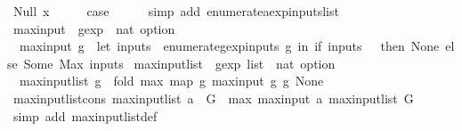 \begin{isabellebody}
\ {\isacharparenleft}Null\ x{\isacharparenright}\isanewline
\ \ \isamarkupfalse%
\ \isamarkupfalse%
\ {\isacharquery}case\isanewline
\ \ \ \ \isamarkupfalse%
\ {\isacharparenleft}simp\ add{\isacharcolon}\ enumerate{\isacharunderscore}aexp{\isacharunderscore}inputs{\isacharunderscore}list{\isacharparenright}\isanewline
{}\isamarkupfalse%
%
\endisatagproof
{\isafoldproof}%
%
\isadelimproof
\isanewline
%
\endisadelimproof
\isanewline
{}\isamarkupfalse%
\ max{\isacharunderscore}input\ {\isacharcolon}{\isacharcolon}\ {\isachardoublequoteopen}gexp\ {\isasymRightarrow}\ nat\ option{\isachardoublequoteclose}\ \isanewline
\ \ {\isachardoublequoteopen}max{\isacharunderscore}input\ g\ {\isacharequal}\ {\isacharparenleft}let\ inputs\ {\isacharequal}\ {\isacharparenleft}enumerate{\isacharunderscore}gexp{\isacharunderscore}inputs\ g{\isacharparenright}\ in\ if\ inputs\ {\isacharequal}\ {\isacharbraceleft}{\isacharbraceright}\ then\ None\ else\ Some\ {\isacharparenleft}Max\ inputs{\isacharparenright}{\isacharparenright}{\isachardoublequoteclose}\isanewline
\isanewline
{}\isamarkupfalse%
\ max{\isacharunderscore}input{\isacharunderscore}list\ {\isacharcolon}{\isacharcolon}\ {\isachardoublequoteopen}gexp\ list\ {\isasymRightarrow}\ nat\ option{\isachardoublequoteclose}\ \isanewline
\ \ {\isachardoublequoteopen}max{\isacharunderscore}input{\isacharunderscore}list\ g\ {\isacharequal}\ {\isacharparenleft}fold\ max\ {\isacharparenleft}map\ {\isacharparenleft}{\isasymlambda}g{\isachardot}\ max{\isacharunderscore}input\ g{\isacharparenright}\ g{\isacharparenright}\ None{\isacharparenright}{\isachardoublequoteclose}\isanewline
\isanewline
{}\isamarkupfalse%
\ max{\isacharunderscore}input{\isacharunderscore}list{\isacharunderscore}cons{\isacharcolon}\ {\isachardoublequoteopen}max{\isacharunderscore}input{\isacharunderscore}list\ {\isacharparenleft}a\ {\isacharhash}\ G{\isacharparenright}\ {\isacharequal}\ max\ {\isacharparenleft}max{\isacharunderscore}input\ a{\isacharparenright}\ {\isacharparenleft}max{\isacharunderscore}input{\isacharunderscore}list\ G{\isacharparenright}{\isachardoublequoteclose}\isanewline
%
\isadelimproof
\ \ %
\endisadelimproof
%
\isatagproof
{}\isamarkupfalse%
\ {\isacharparenleft}simp\ add{\isacharcolon}\ max{\isacharunderscore}input{\isacharunderscore}list{\isacharunderscore}def{\isacharparenright}\isanewline
{}\isamarkupfalse%
\ {\isacharminus}\isanewline
\ \ \isamarkupfalse%

\end{isabellebody}
